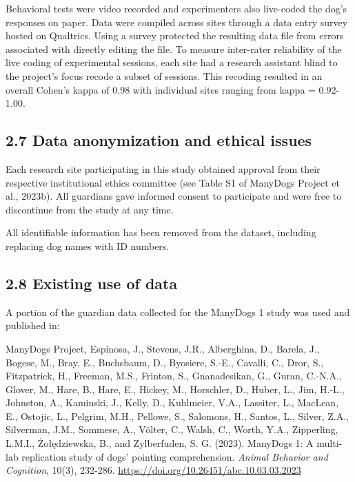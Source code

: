 \documentclass[
  man,floatsintext]{apa6}
\begin{document}
Behavioral tests were video recorded and experimenters also live-coded the dog's responses on paper. Data were compiled across sites through a data entry survey hosted on Qualtrics. Using a survey protected the resulting data file from errors associated with directly editing the file. To measure inter-rater reliability of the live coding of experimental sessions, each site had a research assistant blind to the project's focus recode a subset of sessions. This recoding resulted in an overall Cohen's kappa of 0.98 with individual sites ranging from kappa = 0.92-1.00.

\hypertarget{data-anonymization-and-ethical-issues}{%
\subsection{2.7 Data anonymization and ethical issues}\label{data-anonymization-and-ethical-issues}}

Each research site participating in this study obtained approval from their respective institutional ethics committee (see Table S1 of ManyDogs Project et al., 2023b). All guardians gave informed consent to participate and were free to discontinue from the study at any time.

All identifiable information has been removed from the dataset, including replacing dog names with ID numbers.

\hypertarget{existing-use-of-data}{%
\subsection{2.8 Existing use of data}\label{existing-use-of-data}}

A portion of the guardian data collected for the ManyDogs 1 study was used and published in:

ManyDogs Project, Espinosa, J., Stevens, J.R., Alberghina, D., Barela, J., Bogese, M., Bray, E., Buchsbaum, D., Byosiere, S.-E., Cavalli, C., Dror, S., Fitzpatrick, H., Freeman, M.S., Frinton, S., Gnanadesikan, G., Guran, C.-N.A., Glover, M., Hare, B., Hare, E., Hickey, M., Horschler, D., Huber, L., Jim, H.-L., Johnston, A., Kaminski, J., Kelly, D., Kuhlmeier, V.A., Lassiter, L., MacLean, E., Ostojic, L., Pelgrim, M.H., Pellowe, S., Salomons, H., Santos, L., Silver, Z.A., Silverman, J.M., Sommese, A., Völter, C., Walsh, C.,
Worth, Y.A., Zipperling, L.M.I., Żołędziewska, B., and Zylberfuden, S. G. (2023). ManyDogs 1: A multi-lab replication study of dogs' pointing comprehension. \emph{Animal Behavior and Cognition}, 10(3), 232-286.
\url{https://doi.org/10.26451/abc.10.03.03.2023}
\end{document}

